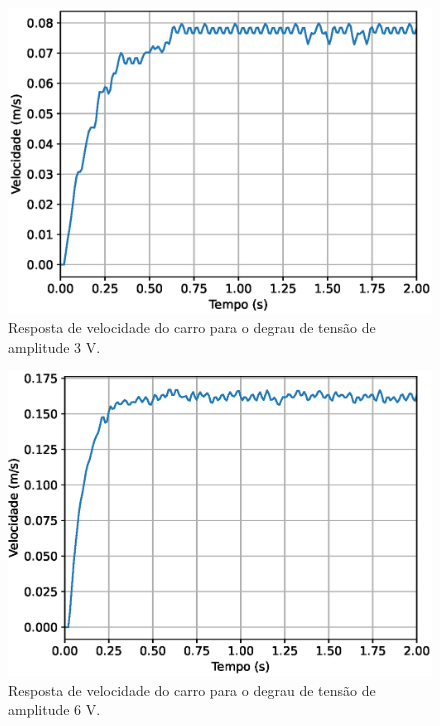 \begin{figure}[H]
    \centering
    \includegraphics[width=0.8\linewidth]{figuras/degrau_3V.eps}
    \caption[Resposta de velocidade do carro para o degrau de tensão de amplitude 3 V]{Resposta de velocidade do carro para o degrau de tensão de amplitude 3 V.}
    \label{fig:resp_degrau3}
\end{figure}

\begin{figure}[H]
    \centering
    \includegraphics[width=0.8\linewidth]{figuras/degrau_6V.eps}
    \caption[Resposta de velocidade do carro para o degrau de tensão de amplitude 6 V]{Resposta de velocidade do carro para o degrau de tensão de amplitude 6 V.}
    \label{fig:resp_degrau6}
\end{figure}

